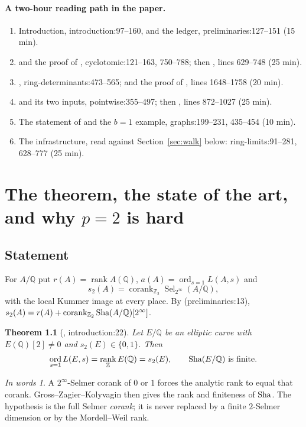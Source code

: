 \documentclass[11pt]{article}
\theoremstyle{remark}
\newtheorem*{inwords}{In words}
\newcommand{\Q}{\mathbb Q}
\newcommand{\Z}{\mathbb Z}
\newcommand{\Sha}{\text{\rm Sha}}
\DeclareMathOperator{\Sel}{Sel}
\DeclareMathOperator{\corank}{corank}
\DeclareMathOperator{\rank}{rank}
\DeclareMathOperator{\ord}{ord}
\newcommand{\src}[2]{\textsf{\small #1:#2}}
\begin{document}
\paragraph{A two-hour reading path in the paper.}
\begin{enumerate}
\item Introduction, \src{introduction}{97--160}, and the ledger,
 \src{preliminaries}{127--151} (15 min).
\item {} and the proof of ,
 \src{cyclotomic}{121--163, 750--788}; then , lines
 629--748 (25 min).
\item {}, \src{ring-determinants}{473--565};
  and the proof of , lines
 1648--1758 (20 min).
\item {} and its two inputs, \src{pointwise}{355--497}; then
 , lines 872--1027 (25 min).
\item The statement of  and the $b=1$ example,
 \src{graphs}{199--231, 435--454} (10 min).
\item The infrastructure, read against Section~\ref{sec:walk} below:
 \src{ring-limits}{91--281, 628--777} (25 min).
\end{enumerate}

\setcounter{tocdepth}{1}
\tableofcontents

\section{The theorem, the state of the art, and why $p=2$ is hard}
\label{sec:thm}

\subsection{Statement}
For $A/\Q$ put $r(A)=\rank A(\Q)$, $a(A)=\ord_{s=1}L(A,s)$ and
\[
 s_2(A)=\corank_{\Z_2}\Sel_{2^\infty}(A/\Q),
\]
with the local Kummer image at every place. By 
(\src{preliminaries}{13}), $s_2(A)=r(A)+\corank_{\Z_2}\Sha(A/\Q)[2^\infty]$.

\medskip
\noindent\textbf{Theorem 1.1} (, \src{introduction}{22}).
\emph{Let $E/\Q$ be an elliptic curve with $E(\Q)[2]\ne0$ and
$s_2(E)\in\{0,1\}$. Then}
\[
 \ord_{s=1}L(E,s)=\rank_\Z E(\Q)=s_2(E),\qquad \Sha(E/\Q)\text{ is finite.}
\]

\begin{inwords}
A $2^\infty$-Selmer corank of $0$ or $1$ forces the analytic rank to equal
that corank. Gross--Zagier--Kolyvagin then gives the rank and finiteness of
$\Sha$. The hypothesis is the full Selmer \emph{corank}; it is never replaced
by a finite $2$-Selmer dimension or by the Mordell--Weil rank.
\end{inwords}
\end{document}
